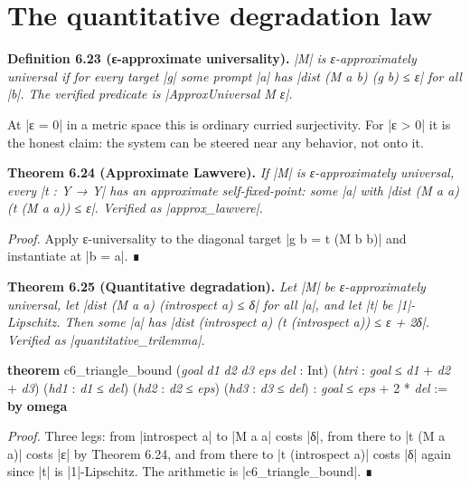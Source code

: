 \documentclass{memoir}
\begin{document}
\section{The quantitative degradation law}\label{Two--Schemas--of--Impossibility-005F-005F-005F--Machine--Checked--Limits--of--Trustworthy--Machine--Learning-005F-005F-005F--and--Why--They--Tighten--with--Capability----Approximate--Bridges--to--Real--Models----The--quantitative--degradation--law}

\textbf{Definition 6.23 (ε-approximate universality).} \emph{\LeanVerb|M| is ε-approximately universal if
for every target \LeanVerb|g| some prompt \LeanVerb|a| has \LeanVerb|dist (M a b) (g b) ≤ ε| for all \LeanVerb|b|.
The verified predicate is \LeanVerb|ApproxUniversal M ε|.}

At \LeanVerb|ε = 0| in a metric space this is ordinary curried surjectivity. For \LeanVerb|ε > 0|
it is the honest claim: the system can be steered near any behavior, not onto
it.

\textbf{Theorem 6.24 (Approximate Lawvere).} \emph{If \LeanVerb|M| is ε-approximately universal, every
\LeanVerb|t : Y → Y| has an approximate self-fixed-point: some \LeanVerb|a| with \LeanVerb|dist (M a a) (t (M a a)) ≤ ε|.
Verified as \LeanVerb|approx_lawvere|.}

\emph{Proof.} Apply ε-universality to the diagonal target \LeanVerb|g b = t (M b b)| and
instantiate at \LeanVerb|b = a|. ∎

\textbf{Theorem 6.25 (Quantitative degradation).} \emph{Let \LeanVerb|M| be ε-approximately universal,
let \LeanVerb|dist (M a a) (introspect a) ≤ δ| for all \LeanVerb|a|, and let \LeanVerb|t| be \LeanVerb|1|-Lipschitz.
Then some \LeanVerb|a| has \LeanVerb|dist (introspect a) (t (introspect a)) ≤ ε + 2δ|. Verified as
\LeanVerb|quantitative_trilemma|.}

\begin{LeanVerbatim}
\textbf{theorem} c6_triangle_bound
    (\textit{goal} \textit{d1} \textit{d2} \textit{d3} \textit{eps} \textit{del} : Int)
    (\textit{htri} : \textit{goal} ≤ \textit{d1} + \textit{d2} + \textit{d3})
    (\textit{hd1} : \textit{d1} ≤ \textit{del}) (\textit{hd2} : \textit{d2} ≤ \textit{eps}) (\textit{hd3} : \textit{d3} ≤ \textit{del}) :
    \textit{goal} ≤ \textit{eps} + 2 * \textit{del} := \textbf{by} \textbf{omega}

\end{LeanVerbatim}


\emph{Proof.} Three legs: from \LeanVerb|introspect a| to \LeanVerb|M a a| costs \LeanVerb|δ|, from there to
\LeanVerb|t (M a a)| costs \LeanVerb|ε| by Theorem 6.24, and from there to \LeanVerb|t (introspect a)|
costs \LeanVerb|δ| again since \LeanVerb|t| is \LeanVerb|1|-Lipschitz. The arithmetic is
\LeanVerb|c6_triangle_bound|. ∎
\end{document}

